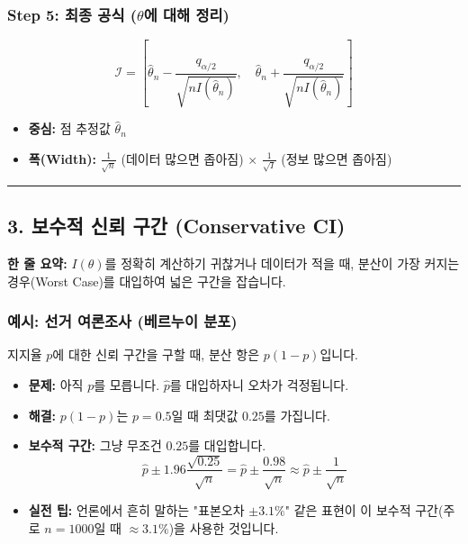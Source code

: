 \documentclass[11pt,a4paper]{book}
\theoremstyle{definition}
\begin{document}
\subsubsection*{Step 5: 최종 공식 ($\theta$에 대해 정리)}
$$ \mathcal{I} = \left[ \hat{\theta}_n - \frac{q_{\alpha/2}}{\sqrt{n I(\hat{\theta}_n)}}, \quad \hat{\theta}_n + \frac{q_{\alpha/2}}{\sqrt{n I(\hat{\theta}_n)}} \right] $$
\begin{itemize}
    \item \textbf{중심:} 점 추정값 $\hat{\theta}_n$
    \item \textbf{폭(Width):} $\frac{1}{\sqrt{n}}$ (데이터 많으면 좁아짐) $\times$ $\frac{1}{\sqrt{I}}$ (정보 많으면 좁아짐)
\end{itemize}

\vspace{0.5cm}\hrule\vspace{0.5cm}

\subsection{3. 보수적 신뢰 구간 (Conservative CI)}

\begin{conceptbox}[title={개념 3: 잘 모를 땐 최악의 상황을 가정하라}]
\textbf{한 줄 요약:} $I(\theta)$를 정확히 계산하기 귀찮거나 데이터가 적을 때, 분산이 가장 커지는 경우(Worst Case)를 대입하여 넓은 구간을 잡습니다.
\end{conceptbox}

\subsubsection*{예시: 선거 여론조사 (베르누이 분포)}
지지율 $p$에 대한 신뢰 구간을 구할 때, 분산 항은 $p(1-p)$입니다.
\begin{itemize}
    \item \textbf{문제:} 아직 $p$를 모릅니다. $\hat{p}$를 대입하자니 오차가 걱정됩니다.
    \item \textbf{해결:} $p(1-p)$는 $p=0.5$일 때 최댓값 $0.25$를 가집니다.
    \item \textbf{보수적 구간:} 그냥 무조건 $0.25$를 대입합니다.
    $$ \hat{p} \pm 1.96 \frac{\sqrt{0.25}}{\sqrt{n}} = \hat{p} \pm \frac{0.98}{\sqrt{n}} \approx \hat{p} \pm \frac{1}{\sqrt{n}} $$
    \item \textbf{실전 팁:} 언론에서 흔히 말하는 "표본오차 $\pm 3.1\%$" 같은 표현이 이 보수적 구간(주로 $n=1000$일 때 $\approx 3.1\%$)을 사용한 것입니다.
\end{itemize}
\end{document}
